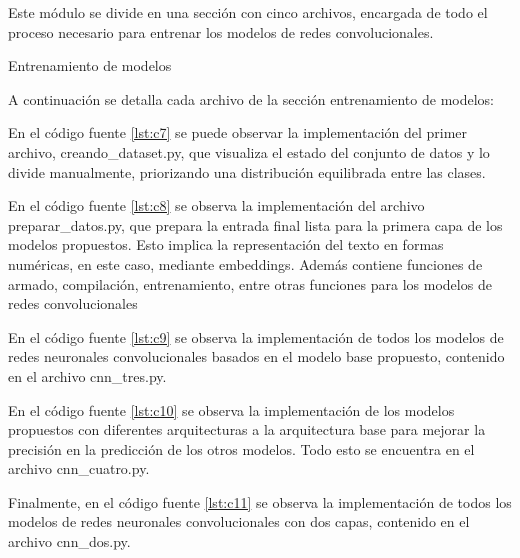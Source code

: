 Este módulo se divide en una sección con cinco archivos, encargada de todo el proceso necesario para entrenar los modelos de redes convolucionales.

Entrenamiento de modelos

A continuación se detalla cada archivo de la sección entrenamiento de modelos:

En el código fuente \ref{lst:c7} se puede observar la implementación del primer archivo, creando\_dataset.py, que visualiza el estado del conjunto de datos y lo divide manualmente, priorizando una distribución equilibrada entre las clases.



En el código fuente \ref{lst:c8} se observa la implementación del archivo preparar\_datos.py, que prepara la entrada final lista para la primera capa de los modelos propuestos. Esto implica la representación del texto en formas numéricas, en este caso, mediante embeddings. Además contiene funciones de armado, compilación, entrenamiento, entre otras funciones para los modelos de redes convolucionales



En el código fuente \ref{lst:c9} se observa la implementación de todos los modelos de redes neuronales convolucionales basados en el modelo base propuesto, contenido en el archivo cnn\_tres.py.



En el código fuente \ref{lst:c10} se observa la implementación de los modelos propuestos con diferentes arquitecturas a la arquitectura base para mejorar la precisión en la predicción de los otros modelos. Todo esto se encuentra en el archivo cnn\_cuatro.py.



Finalmente, en el código fuente \ref{lst:c11} se observa la implementación de todos los modelos de redes neuronales convolucionales con dos capas, contenido en el archivo cnn\_dos.py.



